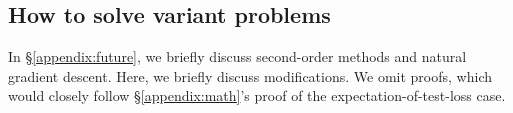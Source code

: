 \documentclass[anon,12pt]{colt2021} %
\newcommand{\rvalue}{\text{\textnormal{rvalue}}}
\newcommand{\plotmooh}[3]{\texttt{[image: ../\#1]}}
\newcommand{\dmoo}[2]{\texttt{[image: ../diagrams/\#2]}}
\newcommand{\sizeddia}[2]{%
    \begin{gathered}%
        \texttt{[image: ../diagrams/\#1.png]}%
    \end{gathered}%
}
\newcommand{\sdia}[1]{\protect \sizeddia{#1}{0.10}}
\begin{document}





    \subsection{How to solve variant problems}                      \label{appendix:solve-variants}
        In \S\ref{appendix:future}, we briefly discuss second-order methods
        and natural gradient descent.  Here, we briefly discuss modifications.
        We omit proofs, which would closely follow \S\ref{appendix:math}'s
        proof of the expectation-of-test-loss case.
\end{document}
